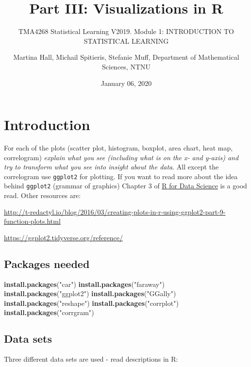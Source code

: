 \documentclass[]{article}
\title{Part III: Visualizations in R}
\subtitle{TMA4268 Statistical Learning V2019. Module 1: INTRODUCTION TO
STATISTICAL LEARNING}
\author{Martina Hall, Michail Spitieris, Stefanie Muff, Department of
Mathematical Sciences, NTNU}
\date{January 06, 2020}
\newenvironment{Shaded}{\begin{snugshade}}{\end{snugshade}}
\newcommand{\KeywordTok}[1]{\textcolor[rgb]{0.13,0.29,0.53}{\textbf{#1}}}
\newcommand{\StringTok}[1]{\textcolor[rgb]{0.31,0.60,0.02}{#1}}
\newcommand{\NormalTok}[1]{#1}
\begin{document}
\maketitle


\section{Introduction}\label{introduction}

For each of the plots (scatter plot, histogram, boxplot, area chart,
heat map, correlogram) \emph{explain what you see (including what is on
the x- and y-axis) and try to transform what you see into insight about
the data}. All except the correlogram use \texttt{ggplot2} for plotting.
If you want to read more about the idea behind \texttt{ggplot2} (grammar
of graphics) Chapter 3 of
\href{https://r4ds.had.co.nz/data-visualisation.html}{R for Data
Science} is a good read. Other resources are:

\url{http://t-redactyl.io/blog/2016/03/creating-plots-in-r-using-ggplot2-part-9-function-plots.html}

\url{https://ggplot2.tidyverse.org/reference/}

\subsection{Packages needed}\label{packages-needed}

\begin{Shaded}
\begin{Highlighting}[]
\KeywordTok{install.packages}\NormalTok{(}\StringTok{"car"}\NormalTok{)}
\KeywordTok{install.packages}\NormalTok{(}\StringTok{"faraway"}\NormalTok{)}
\KeywordTok{install.packages}\NormalTok{(}\StringTok{"ggplot2"}\NormalTok{)}
\KeywordTok{install.packages}\NormalTok{(}\StringTok{"GGally"}\NormalTok{)}
\KeywordTok{install.packages}\NormalTok{(}\StringTok{"reshape"}\NormalTok{)}
\KeywordTok{install.packages}\NormalTok{(}\StringTok{"corrplot"}\NormalTok{)}
\KeywordTok{install.packages}\NormalTok{(}\StringTok{"corrgram"}\NormalTok{)}
\end{Highlighting}
\end{Shaded}

\subsection{Data sets}\label{data-sets}

Three different data sets are used - read descriptions in R:
\end{document}
